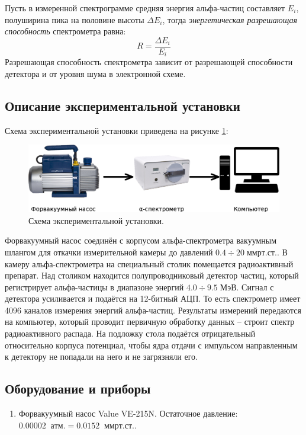 \documentclass[10pt,a4paper]{article}
\newcommand{\atm}[1][\;]{#1 атм.}
\newcommand{\mmhg}[1][\;]{#1 мм рт.ст.}
\newcommand{\MeV}[1][\;]{#1 МэВ}
\begin{document}
\begin{multicols}{2}
	Пусть в измеренной спектрограмме средняя энергия альфа-частиц составляет $E_i$, полуширина пика на половине высоты $\Delta E_i$, тогда \textit{энергетическая разрешающая способность} спектрометра равна:
	$$
	R = \frac{\Delta E_i}{E_i}
	$$
	Разрешающая способность спектрометра зависит от разрешающей способности детектора и от уровня шума в электронной схеме.
			
		
	\subsection*{Описание экспериментальной установки}
	
	Схема экспериментальной установки приведена на рисунке \ref{img:exp_scheme}:
		
	\begin{figure}[H]
		\centering
		\includegraphics[width=1\textwidth]{images/exp_scheme.png}
		\caption{Схема экспериментальной установки.}
		\label{img:exp_scheme}
	\end{figure}

	Форвакуумный насос соединён с корпусом альфа-спектрометра вакуумным шлангом для откачки измерительной камеры до давлений $0.4 \div 20 \mmhg$. В камеру альфа-спектрометра на специальный столик помещается радиоактивный препарат. Над столиком находится полупроводниковый детектор частиц, который регистрирует альфа-частицы в диапазоне энергий $4.0 \div 9.5 \MeV$. Сигнал с детектора усиливается и подаётся на 12-битный АЦП. То есть спектрометр имеет 4096 каналов измерения энергий альфа-частиц. Результаты измерений передаются на компьютер, который проводит первичную обработку данных -- строит спектр радиоактивного распада. На подложку стола подаётся отрицательный относительно корпуса потенциал, чтобы ядра отдачи с импульсом направленным к детектору не попадали на него и не загрязняли его.
	
	\subsection*{Оборудование и приборы}
	\begin{enumerate}
		\item Форвакуумный насос Value VE-215N. Остаточное давление: $0.00002 \; \atm = 0.0152 \;\mmhg$.
		

\end{enumerate}
\end{multicols}
\end{document}
